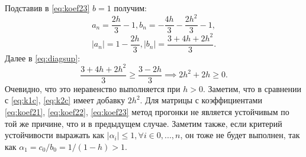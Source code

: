 \documentclass[a4paper,12pt]{article}
\begin{document}
\begin{flushleft}
  Подставив в \eqref{eq:koef23} $b=1$ получим:
  \begin{equation*}
    a_n = \frac{2h}{3} - 1, b_n = -\frac{4h}{3} - \frac{2h^2}{3} - 1,
  \end{equation*}
  \begin{equation*}
    \mathopen| a_n \mathclose| = 1 - \frac{2h}{3}, \mathopen| b_n \mathclose| = \frac{3 + 4h + 2h^2}{3}.
  \end{equation*}
  Далее в \eqref{eq:diagsup}:
  \begin{equation}\label{eq:k2c}
    \frac{3+4h+2h^2}{3} \ge \frac{3 - 2h}{3} \implies 2h^2 + 2h \ge 0.
  \end{equation}
  Очевидно, что это неравенство выполняется при $h > 0$. Заметим, что в сравнении с \eqref{eq:k1c}, \eqref{eq:k2c} имеет добавку $2h^2$.\linebreak\linebreak
  Для матрицы с коэффициентами \eqref{eq:koef21}, \eqref{eq:koef22}, \eqref{eq:koef23} метод прогонки не является устойчивым по той же причине, что и в предыдущем случае.\linebreak\linebreak
  Заметим также, если критерий устойчивости выражать как $\mathopen| \alpha_i \mathclose| \le 1, \forall i \in 0, ..., n$, он тоже не будет выполнен, так как $\alpha_1 = c_0/b_0 = 1/(1-h) > 1$.\linebreak

  
\end{flushleft}
\end{document}
